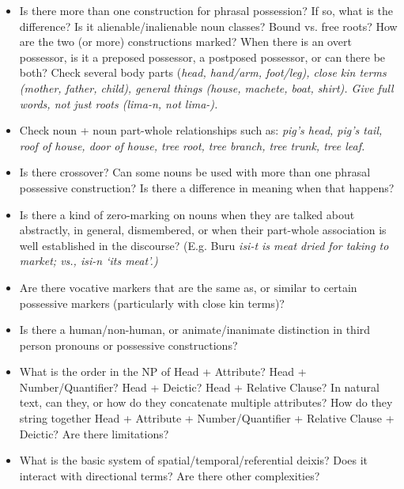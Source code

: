 \begin{itemize}
	\item	Is there more than one construction for phrasal possession?
				If so, what is the difference? Is it alienable/inalienable noun classes? Bound vs.
				free roots? How are the two (or more) constructions marked? When
				there is an overt possessor,
				is it a preposed possessor,
				a postposed possessor, or can there be both? Check several body
				parts (\it{head, hand/arm, foot/leg}), close kin terms (\it{mother,
				father, child}), general things (\it{house, machete, boat, shirt}).
				Give full words, not just roots (\it{lima-n,} not \it{lima-}).

	\item	Check noun + noun part-whole relationships such as: \it{pig’s
				head, pig’s tail, roof of house, door of house,
				tree root, tree branch,
				tree trunk, tree leaf.}

	\item	Is there crossover? Can some nouns be used with more than one
				phrasal possessive construction? Is there a difference in meaning
				when that happens?
				
	\item	Is there a kind of zero-marking on nouns when they are talked
				about abstractly, in general, dismembered, or when their part-whole association
				is well established in the discourse? (E.g.
				Buru \it{isi-t} is meat dried for taking to market; vs.,
				\it{isi-n} ‘its meat’.)
				
	\item	Are there vocative markers that are the same as,
				or similar to certain possessive markers (particularly with close
				kin terms)?
				
	\item	Is there a human/non-human,
				or animate/inanimate distinction in third person pronouns or
				possessive constructions?
				
	\item	What is the order in the NP of Head + Attribute? Head + Number/Quantifier?
				Head + Deictic? Head + Relative Clause? In natural text,
				can they, or how do they concatenate multiple attributes? How
				do they string together Head + Attribute + Number/Quantifier
				+ Relative Clause + Deictic? Are there limitations?

	\item	What is the basic system of spatial/temporal/referential deixis?
				Does it interact with directional terms? Are there other complexities?


\end{itemize}
